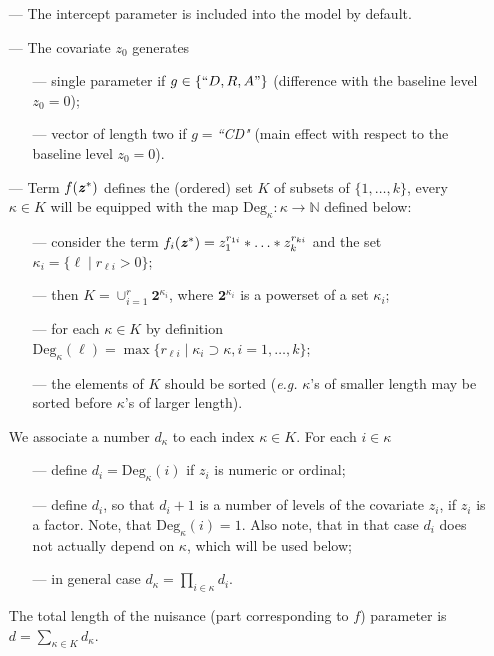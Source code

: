 \documentclass[11pt]{article}
\begin{document}
\begin{itemize}
\setlength\itemsep{-0.3em}
\item[---]
The intercept parameter is included into the model by default.
\item[---]
The covariate $z_0$ generates\vspace{-2mm}
\begin{itemize}
\setlength\itemsep{-0.3em}
\item[---]
single parameter if $g\in\{``D,R,A"\}$ (difference with the baseline level $z_0=0$);
\item[---]
vector of length two if $g=${\it ``CD"} (main effect with respect to the baseline level $z_0=0$).
\end{itemize}
\item[---]
Term $f(\mbox{\textbf{\textit z}}^*)$ defines the (ordered) set $K$ of subsets of $\{1,\ldots,k\}$, every $\kappa\in K$ will be equipped with the map $\mathrm{Deg}_\kappa\colon \kappa\to \mathbb{N}$ defined below:
\vspace{-2mm}
\begin{itemize}
\setlength\itemsep{-0.3em}
\item[---]
consider the term $f_i(\mbox{\textbf{\textit z}}^*)=z_1^{r_{1i}}*\ldots*z_k^{r_{ki}}$ and the set $\kappa_i = \{\ell \mid r_{\ell i} > 0\}$;
\item[---]
then $K=\cup_{i=1}^r \mathbf{2}^{\kappa_i}$, where $\mathbf{2}^{\kappa_i}$ is a powerset of a set $\kappa_i$;
\item[---]
for each $\kappa\in K$ by definition $\mathrm{Deg}_\kappa(\ell) = \max \{r_{\ell i} \mid \kappa_i \supset \kappa, i = 1,\ldots,k \}$;
\item[---]
the elements of $K$ should be sorted (\textit{e.g.} $\kappa$'s of smaller length may be sorted before $\kappa$'s of larger length).
\end{itemize}
We associate a number $d_{\kappa}$ to each index $\kappa\in K$. For each $i\in\kappa$\vspace{-2mm}
\begin{itemize}
\setlength\itemsep{-0.3em}
\item[---]
define $d_i=\mathrm{Deg}_\kappa(i)$ if $z_i$ is numeric or ordinal;
\item[---]
define $d_i$, so that $d_i+1$ is a number of levels of the covariate $z_i$, if $z_i$ is a factor. Note, that $\mathrm{Deg}_\kappa(i) = 1$. Also note, that in that case $d_i$ does not actually depend on $\kappa$, which will be used below;
\item[---]
in general case $d_{\kappa}=\prod_{i\in\kappa} d_i$. 
\end{itemize}
The total length of the nuisance (part corresponding to $f$) parameter is $d=\sum_{\kappa\in K} d_{\kappa}$. 
\end{itemize}
\end{document}
